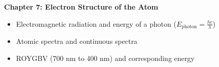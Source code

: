 \documentclass[12pt]{article}
\begin{document}
\textbf{Chapter 7: Electron Structure of the Atom}

\begin{itemize}
\item Electromagnetic radiation and energy of a photon
  ($E_\text{photon} = \frac{hc}{\lambda}$)
\item Atomic spectra and continuous spectra
\item ROYGBV (700 nm to 400 nm) and corresponding energy
\end{itemize}
\end{document}
